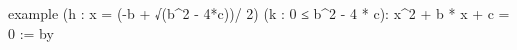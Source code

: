 \documentclass{article}
\begin{document}
\begin{leancode}
example (h : x = (-b + √(b^2 - 4*c))/ 2)
  (k : 0 ≤ b^2 - 4 * c):  x^2 + b * x + c = 0 := by
\end{leancode}
\end{document}
